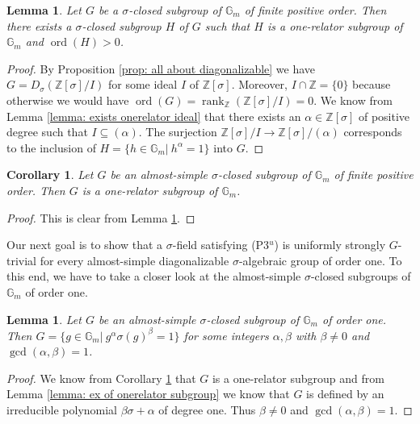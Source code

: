 \documentclass[oneside,reqno]{amsart}
\newtheorem{lemma}[theo]{Lemma}
\newtheorem{cor}[theo]{Corollary}
\theoremstyle{definition}
\newcommand{\ord}{\operatorname{ord}}
\newcommand{\s}{\sigma}
\newcommand{\Gm}{\mathbb{G}_m}
\newcommand{\ZZ}{\mathbb{Z}}
\newcommand{\rank}{\operatorname{rank}}
\newcommand{\pt}{{\rm{(P3$^u$)}}}
\begin{document}
\begin{lemma} \label{lemma: exists one-relator}
	Let $G$ be a $\s$-closed subgroup of $\Gm$ of finite positive order. Then there exists a $\s$-closed subgroup $H$ of $G$ such that $H$ is a one-relator subgroup of $\Gm$ and $\ord(H)>0$.  
\end{lemma}	
\begin{proof}
	By Proposition \ref{prop: all about diagonalizable} we have $G=D_\s(\ZZ[\s]/I)$ for some ideal $I$ of $\ZZ[\s]$. Moreover, $I\cap \ZZ=\{0\}$ because otherwise we would have $\ord(G)=\rank_{\ZZ}(\ZZ[\s]/I)=0$. We know from Lemma \ref{lemma: exists onerelator ideal} that there exists an $\alpha\in \ZZ[\s]$ of positive degree such that $I\subseteq (\alpha)$. The surjection $\ZZ[\s]/I\to \ZZ[\s]/(\alpha)$ corresponds to the inclusion of $H=\{h\in\Gm|\ h^\alpha=1\}$ into $G$.
\end{proof}	



\begin{cor} \label{cor: is one-relator}
	Let $G$ be an almost-simple $\s$-closed subgroup of $\Gm$ of finite positive order. Then $G$ is a one-relator subgroup of $\Gm$.  
\end{cor}	
\begin{proof}
	This is clear from Lemma \ref{lemma: exists one-relator}.
\end{proof}	



%



Our next goal is to show that a $\s$-field satisfying \pt{} is uniformly strongly $G$-trivial for every almost-simple diagonalizable $\s$-algebraic group of order one. To this end, we have to take a closer look at the almost-simple $\s$-closed subgroups of $\Gm$ of order one.

\begin{lemma} \label{lemma: almost simple sclosed subgr of Gm of order 1}
	Let $G$ be an almost-simple $\s$-closed subgroup of $\Gm$ of order one. Then $G=\{g\in\Gm|\ g^{\alpha}\s(g)^{\beta}=1\}$ for some integers $\alpha,\beta$ with $\beta\neq 0$ and $\gcd(\alpha,\beta)=1$. 
\end{lemma}
\begin{proof}
	We know from Corollary \ref{cor: is one-relator} that $G$ is a one-relator subgroup and from Lemma \ref{lemma: ex of onerelator subgroup} we know that $G$ is defined by an irreducible polynomial $\beta\s+\alpha$ of degree one. Thus $\beta\neq 0$ and $\gcd(\alpha,\beta)=1$. 
\end{proof}	
\end{document}
